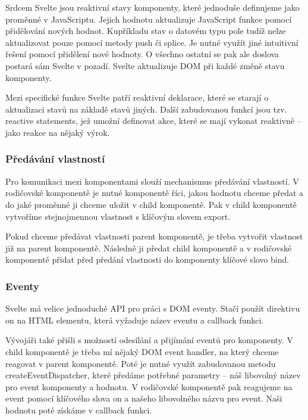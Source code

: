 Srdcem Svelte jsou reaktivní stavy komponenty, které jednoduše definujeme jako proměnné v JavaScriptu. Jejich hodnotu aktualizuje JavaScript funkce pomocí přidělování nových hodnot. 
Kupříkladu stav o datovém typu pole tudíž nelze aktualizovat pouze pomocí metody push či splice. Je nutné využít jiné intuitivní řešení pomocí přidělení nové hodnoty.
O všechno ostatní se pak ale doslova postará sám Svelte v pozadí. Svelte aktualizuje DOM při každé změně stavu komponenty. 

Mezi specifické funkce Svelte patří reaktivní deklarace, které se starají o aktualizaci stavů na základě stavů jiných. 
Další zabudovanou funkcí jsou tzv. reactive statements, jež umožní definovat akce, které se mají vykonat reaktivně -- jako reakce na nějaký výrok.\cite{sveltehandbook,svelte}

\subsubsection{Předávání vlastností}

Pro komunikaci mezi komponentami slouží mechanismus předávání vlastností. 
V rodičovské komponentě je nutné komponentě říci, jakou hodnotu chceme předat a do jaké proměnné ji chceme uložit v child komponentě. 
Pak v child komponentě vytvoříme stejnojmennou vlastnost s klíčovým slovem export.

Pokud chceme předávat vlastnosti parent komponentě, je třeba vytvořit vlastnost již na parent komponentě. 
Následně ji předat child komponentě a v rodičovské komponentě přidat před předání vlastnosti do komponenty klíčové slovo bind.\cite{svelte}

\subsubsection{Eventy}

Svelte má velice jednoduché API pro práci s DOM eventy. Stačí použít direktivu on na HTML elementu, která vyžaduje název eventu a callback funkci.

Vývojáři také přišli s možností odesílání a přijímání eventů pro komponenty. 
V child komponentě je třeba mí nějaký DOM event handler, na který chceme reagovat v parent komponentě. 
Poté je nutné využít zabudovanou metodu createEventDispatcher, které předáme potřebné parametry -- náš libovolný název pro event komponenty a hodnotu. 
V rodičovské komponentě pak reagujeme na event pomocí klíčového slova on a našeho libovolného názvu pro event. Naši hodnotu poté získáme v callback funkci.\cite{sveltehandbook,svelte}


